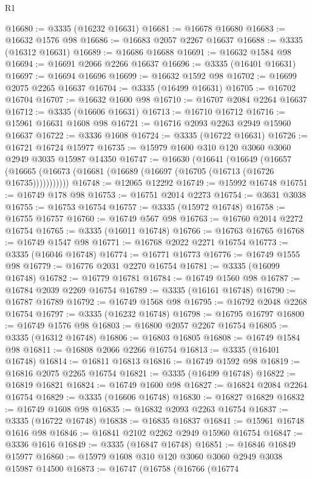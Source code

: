 \begin{lexlean}{R1}
\begin{coremodule}
@16680 := @3335 (@16232 @16631)
@16681 := @16678 @16680
@16683 := @16632 @1576 @98
@16686 := @16683 @2057 @2267 @16637
@16688 := @3335 (@16312 @16631)
@16689 := @16686 @16688
@16691 := @16632 @1584 @98
@16694 := @16691 @2066 @2266 @16637
@16696 := @3335 (@16401 @16631)
@16697 := @16694 @16696
@16699 := @16632 @1592 @98
@16702 := @16699 @2075 @2265 @16637
@16704 := @3335 (@16499 @16631)
@16705 := @16702 @16704
@16707 := @16632 @1600 @98
@16710 := @16707 @2084 @2264 @16637
@16712 := @3335 (@16606 @16631)
@16713 := @16710 @16712
@16716 := @15961 @16631 @1608 @98
@16721 := @16716 @2093 @2263 @2949 @15960 @16637
@16722 := @3336 @1608
@16724 := @3335 (@16722 @16631)
@16726 := @16721 @16724 @15977
@16735 := @15979 @1600 @310 @120 @3060 @3060 @2949 @3035 @15987 @14350
@16747 := @16630
    (@16641
      (@16649
        (@16657 (@16665 (@16673 (@16681 (@16689 (@16697 (@16705 (@16713 (@16726 @16735)))))))))))
@16748 := @12065 @12292
@16749 := @15992 @16748
@16751 := @16749 @178 @98
@16753 := @16751 @2014 @2273
@16754 := @3631 @3038
@16755 := @16753 @16754
@16757 := @3335 (@15972 @16748)
@16758 := @16755 @16757
@16760 := @16749 @567 @98
@16763 := @16760 @2014 @2272 @16754
@16765 := @3335 (@16011 @16748)
@16766 := @16763 @16765
@16768 := @16749 @1547 @98
@16771 := @16768 @2022 @2271 @16754
@16773 := @3335 (@16046 @16748)
@16774 := @16771 @16773
@16776 := @16749 @1555 @98
@16779 := @16776 @2031 @2270 @16754
@16781 := @3335 (@16099 @16748)
@16782 := @16779 @16781
@16784 := @16749 @1560 @98
@16787 := @16784 @2039 @2269 @16754
@16789 := @3335 (@16161 @16748)
@16790 := @16787 @16789
@16792 := @16749 @1568 @98
@16795 := @16792 @2048 @2268 @16754
@16797 := @3335 (@16232 @16748)
@16798 := @16795 @16797
@16800 := @16749 @1576 @98
@16803 := @16800 @2057 @2267 @16754
@16805 := @3335 (@16312 @16748)
@16806 := @16803 @16805
@16808 := @16749 @1584 @98
@16811 := @16808 @2066 @2266 @16754
@16813 := @3335 (@16401 @16748)
@16814 := @16811 @16813
@16816 := @16749 @1592 @98
@16819 := @16816 @2075 @2265 @16754
@16821 := @3335 (@16499 @16748)
@16822 := @16819 @16821
@16824 := @16749 @1600 @98
@16827 := @16824 @2084 @2264 @16754
@16829 := @3335 (@16606 @16748)
@16830 := @16827 @16829
@16832 := @16749 @1608 @98
@16835 := @16832 @2093 @2263 @16754
@16837 := @3335 (@16722 @16748)
@16838 := @16835 @16837
@16841 := @15961 @16748 @1616 @98
@16846 := @16841 @2102 @2262 @2949 @15960 @16754
@16847 := @3336 @1616
@16849 := @3335 (@16847 @16748)
@16851 := @16846 @16849 @15977
@16860 := @15979 @1608 @310 @120 @3060 @3060 @2949 @3038 @15987 @14500
@16873 := @16747
    (@16758
      (@16766
        (@16774

\end{coremodule}
\end{lexlean}
